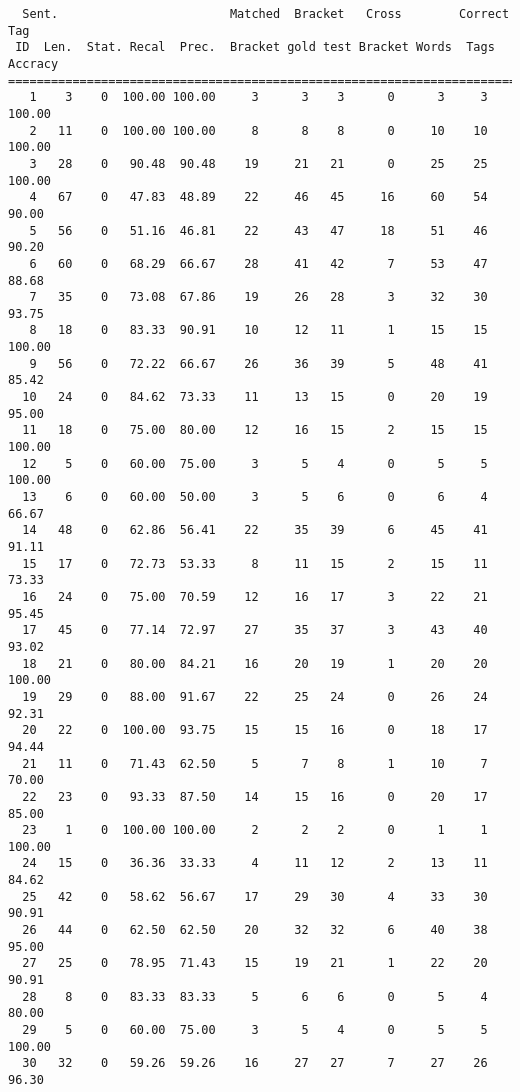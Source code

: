 \scriptsize
\begin{verbatim}
  Sent.                        Matched  Bracket   Cross        Correct Tag
 ID  Len.  Stat. Recal  Prec.  Bracket gold test Bracket Words  Tags Accracy
============================================================================
   1    3    0  100.00 100.00     3      3    3      0      3     3   100.00
   2   11    0  100.00 100.00     8      8    8      0     10    10   100.00
   3   28    0   90.48  90.48    19     21   21      0     25    25   100.00
   4   67    0   47.83  48.89    22     46   45     16     60    54    90.00
   5   56    0   51.16  46.81    22     43   47     18     51    46    90.20
   6   60    0   68.29  66.67    28     41   42      7     53    47    88.68
   7   35    0   73.08  67.86    19     26   28      3     32    30    93.75
   8   18    0   83.33  90.91    10     12   11      1     15    15   100.00
   9   56    0   72.22  66.67    26     36   39      5     48    41    85.42
  10   24    0   84.62  73.33    11     13   15      0     20    19    95.00
  11   18    0   75.00  80.00    12     16   15      2     15    15   100.00
  12    5    0   60.00  75.00     3      5    4      0      5     5   100.00
  13    6    0   60.00  50.00     3      5    6      0      6     4    66.67
  14   48    0   62.86  56.41    22     35   39      6     45    41    91.11
  15   17    0   72.73  53.33     8     11   15      2     15    11    73.33
  16   24    0   75.00  70.59    12     16   17      3     22    21    95.45
  17   45    0   77.14  72.97    27     35   37      3     43    40    93.02
  18   21    0   80.00  84.21    16     20   19      1     20    20   100.00
  19   29    0   88.00  91.67    22     25   24      0     26    24    92.31
  20   22    0  100.00  93.75    15     15   16      0     18    17    94.44
  21   11    0   71.43  62.50     5      7    8      1     10     7    70.00
  22   23    0   93.33  87.50    14     15   16      0     20    17    85.00
  23    1    0  100.00 100.00     2      2    2      0      1     1   100.00
  24   15    0   36.36  33.33     4     11   12      2     13    11    84.62
  25   42    0   58.62  56.67    17     29   30      4     33    30    90.91
  26   44    0   62.50  62.50    20     32   32      6     40    38    95.00
  27   25    0   78.95  71.43    15     19   21      1     22    20    90.91
  28    8    0   83.33  83.33     5      6    6      0      5     4    80.00
  29    5    0   60.00  75.00     3      5    4      0      5     5   100.00
  30   32    0   59.26  59.26    16     27   27      7     27    26    96.30

\end{verbatim}

